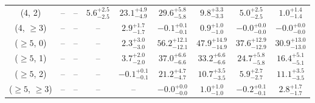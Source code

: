\begin{table}[h!]
{\begin{tabular}{ccccccccc}
	(4, 2) & -- & -- & $5.6^{+ 2.5 }_{- 2.5 }$ & $23.1^{+ 4.9 }_{- 4.9 }$ & $29.6^{+ 5.8 }_{- 5.8 }$ & $9.8^{+ 3.3 }_{- 3.3 }$ & $5.0^{+ 2.5 }_{- 2.5 }$ & $1.0^{+ 1.4 }_{- 1.4 }$ \\[0.5ex] 
	(4, $\ge3$) & -- & -- & -- & $2.9^{+ 1.7 }_{- 1.7 }$ & $-0.1^{+ 0.1 }_{- 0.1 }$ & $0.9^{+ 1.0 }_{- 1.0 }$ & $-0.0^{+ 0.0 }_{- 0.0 }$ & $-0.0^{+ 0.0 }_{- 0.0 }$ \\[0.5ex] 
	($\ge5$, 0) & -- & -- & -- & $2.3^{+ 3.0 }_{- 3.0 }$ & $56.2^{+ 12.1 }_{- 12.1 }$ & $47.9^{+ 14.9 }_{- 14.9 }$ & $37.6^{+ 12.9 }_{- 12.9 }$ & $30.9^{+ 13.0 }_{- 13.0 }$ \\[0.5ex] 
	($\ge5$, 1) & -- & -- & -- & $3.7^{+ 2.0 }_{- 2.0 }$ & $37.0^{+ 6.6 }_{- 6.6 }$ & $33.2^{+ 6.6 }_{- 6.6 }$ & $24.7^{+ 5.8 }_{- 5.8 }$ & $16.4^{+ 5.1 }_{- 5.1 }$ \\[0.5ex] 
	($\ge5$, 2) & -- & -- & -- & $-0.1^{+ 0.1 }_{- 0.1 }$ & $21.2^{+ 4.7 }_{- 4.7 }$ & $10.7^{+ 3.5 }_{- 3.5 }$ & $5.9^{+ 2.7 }_{- 2.7 }$ & $11.1^{+ 3.5 }_{- 3.5 }$ \\[0.5ex] 
	($\ge5$, $\ge3$) & -- & -- & -- & -- & $-0.0^{+ 0.0 }_{- 0.0 }$ & $1.0^{+ 1.0 }_{- 1.0 }$ & $-0.2^{+ 0.1 }_{- 0.1 }$ & $2.8^{+ 1.7 }_{- 1.7 }$ \\[0.5ex] 
	\hline
	\hline
\end{tabular}}
\end{table}

